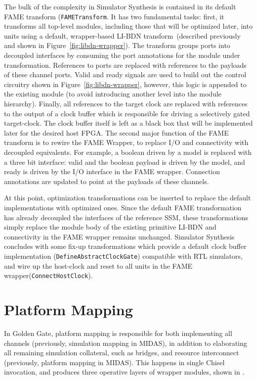 The bulk of the complexity in Simulator Synthesis is contained in its default
FAME transform (\texttt{FAMETransform}. It has two fundamental tasks: first, it
transforms all top-level modules, including those that will be optimized later,
into units using a default, wrapper-based LI-BDN transform~(described
previously and shown in Figure~\ref{fig:libdn-wrapper}). The transform groups
ports into decoupled interfaces by consuming the port annotations for the module under transformation.
References to ports are replaced with references to the payloads
of these channel ports. Valid and ready signals are used to build out the
control circuitry shown in Figure~\ref{fig:libdn-wrapper}, however,
this logic is appended to the existing module (to avoid introducing another
level into the module hierarchy). Finally, all references to the target clock
are replaced with references to the output of a clock buffer which is responsible for driving a selectively
gated target-clock.  The clock
buffer itself is left as a black box that will be implemented later for the
desired host FPGA.  The second major function of the FAME transform is to
rewire the FAME Wrapper, to replace I/O and connectivity with decoupled
equivalents. For example, a boolean driven by a model is replaced with a three
bit interface: valid and the boolean payload is driven by the model, and ready
is driven by the I/O interface in the FAME wrapper. Connection annotations are
updated to point at the payloads of these channels.

At this point, optimization transformations can be inserted to replace the
default implementations with optimized ones. Since the default FAME
transformation has already decoupled the interfaces of the reference SSM, these
transformations simply replace the module body of the existing primitive LI-BDN
and connectivity in the FAME wrapper remains unchanged.  Simulator Synthesis
concludes with some fix-up transformations which provide a default clock buffer
implementation (\texttt{DefineAbstractClockGate}) compatible with RTL
simulators, and wire up the host-clock and reset to all units in the FAME
wrapper(\texttt{ConnectHostClock}).

\section{Platform Mapping}\label{sec:gg-platform-mapping}

In Golden Gate, platform mapping is responsible for both implementing all
channels (previously, simulation mapping in MIDAS), in addition to elaborating
all remaining simulation collateral, such as bridges, and resource interconnect
(previously, platform mapping in MIDAS). This happens in single Chisel
invocation, and produces three operative layers of wrapper modules, shown in . 

